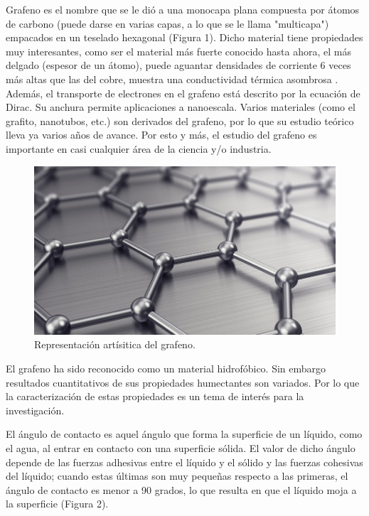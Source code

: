 \documentclass[twocolumn,letterpaper,aps,pra,10pt]{revtex4-1}
\begin{document}
Grafeno es el nombre que se le dió a una monocapa plana compuesta por átomos de carbono (puede darse en varias capas, a lo que se le llama "multicapa") empacados en un teselado hexagonal (Figura 1). Dicho material tiene propiedades muy interesantes, como ser el material más fuerte conocido hasta ahora, el más delgado (espesor de un átomo), puede aguantar densidades de corriente 6 veces más altas que las del cobre, muestra una conductividad térmica asombrosa \cite{grafeno}. Además, el transporte de electrones en el grafeno está descrito por la ecuación de Dirac. Su anchura permite aplicaciones a nanoescala. Varios materiales (como el grafito, nanotubos, etc.) son derivados del grafeno, por lo que su estudio teórico lleva ya varios años de avance\cite{grafeno2}. Por esto y más, el estudio del grafeno es importante en casi cualquier área de la ciencia y/o industria.

\begin{figure}[h]
\centering
\includegraphics[scale=0.7]{grafeno-920x515.jpg}
\caption{Representación artísitica del grafeno.}
\end{figure}

El grafeno ha sido reconocido como un material hidrofóbico. Sin embargo resultados cuantitativos de sus propiedades humectantes son variados. Por lo que la caracterización de estas propiedades es un tema de interés para la investigación\cite{WCA1}. 

El ángulo de contacto es aquel ángulo que forma la superficie de un líquido, como el agua, al entrar en contacto con una superficie sólida. El valor de dicho ángulo depende de las fuerzas adhesivas entre el líquido y el sólido y las fuerzas cohesivas del líquido; cuando estas últimas son muy pequeñas respecto a las primeras, el ángulo de contacto es menor a 90 grados, lo que resulta en que el líquido moja a la superficie (Figura 2).
\end{document}

